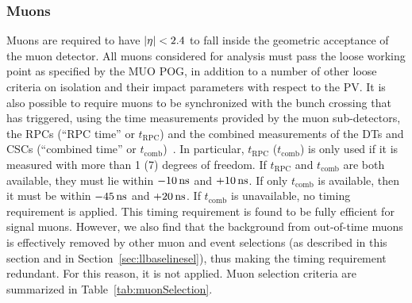 \subsubsection{Muons}\label{sec:llmuon}
Muons are required to have
$|\eta|<2.4$ to fall inside the geometric acceptance of the muon
detector.
All muons considered for analysis must pass the loose working point as
specified by the MUO POG, in addition to a number
of other loose criteria on isolation and their impact parameters with
respect to the PV.
It is also possible to require muons to be synchronized with the bunch
crossing that has triggered, using the time measurements provided by
the muon sub-detectors, the RPCs (``RPC time'' or $t_{\mathrm{RPC}}$)
and the combined measurements of the DTs and CSCs (``combined time''
or $t_{\mathrm{comb}}$)~\cite{muon_oot}.
In particular, $t_{\mathrm{RPC}}$ ($t_{\mathrm{comb}}$) is only used
if it is measured with more than 1 (7) degrees of freedom.
If $t_{\mathrm{RPC}}$ and $t_{\mathrm{comb}}$ are both available,
they must lie within $-10\mathrm{\,ns}$ and $+10\mathrm{\,ns}$.
If only $t_{\mathrm{comb}}$ is available, then it must be within
$-45\mathrm{\,ns}$ and $+20\mathrm{\,ns}$.
If $t_{\mathrm{comb}}$ is unavailable, no timing requirement is
applied.
This timing requirement is found to be fully efficient for signal
muons. However, we also find that the background from out-of-time
muons is effectively removed by other muon and event selections (as
described in this section and in Section~\ref{sec:llbaselinesel}), thus
making the timing requirement redundant. For this reason, it is not
applied.  
Muon selection criteria are summarized in
Table~\ref{tab:muonSelection}.

